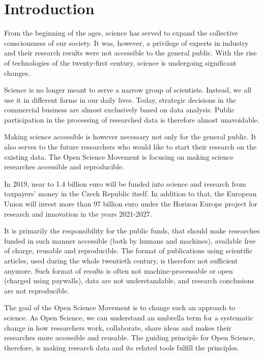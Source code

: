 \chapter{Introduction}

From the beginning of the ages, science has served to expand the collective consciousness of our society.
It was, however, a privilege of experts in industry and their research results were not accessible to the general public.
With the rise of technologies of the twenty-first century, science is undergoing significant changes.

Science is no longer meant to serve a narrow group of scientists.
Instead, we all use it in different forms in our daily lives.
Today, strategic decisions in the commercial business are almost exclusively based on data analysis.
Public participation in the processing of researched data is therefore almost unavoidable.

Making science accessible is however necessary not only for the general public.
It also serves to the future researchers who would like to start their research on the existing data.
The Open Science Movement is focusing on making science researches accessible and reproducible.

In 2019, near to 1.4 billion euro will be funded into science and research from taxpayers' money in the Czech Republic itself\cite{rvvi-budget}.
In addition to that, the European Union will invest more than 97 billion euro under the Horizon Europe project for research and innovation in the years 2021-2027\cite{euc-horizon-budget}.

It is primarily the responsibility for the public funds, that should make researches funded in such manner accessible (both by humans and machines), available free of charge, reusable and reproducible.
The format of publications using scientific articles, used during the whole twentieth century, is therefore not sufficient anymore.
Such format of results is often not machine-processable or open (charged using paywalls), data are not understandable, and research conclusions are not reproducible.

The goal of the Open Science Movement is to change such an approach to science.
As Open Science, we can understand an umbrella term for a systematic change in how researchers work, collaborate, share ideas and makes their researches more accessible and reusable.
The guiding principle for Open Science, therefore, is making research data and its related tools fulfill the  principles.


